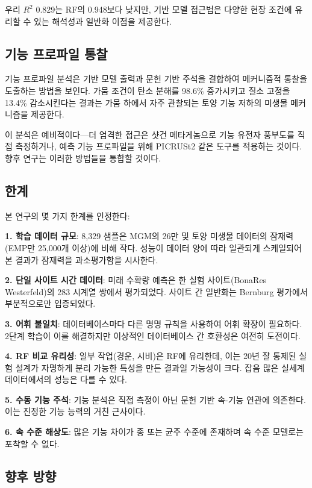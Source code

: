 \documentclass[11pt,a4paper]{article}
\begin{document}
우리 $R^2$ 0.829는 RF의 0.948보다 낮지만, 기반 모델 접근법은 다양한 현장 조건에 유리할 수 있는 해석성과 일반화 이점을 제공한다.

\subsection{기능 프로파일 통찰}

기능 프로파일 분석은 기반 모델 출력과 문헌 기반 주석을 결합하여 메커니즘적 통찰을 도출하는 방법을 보인다. 가뭄 조건이 탄소 분해를 98.6\% 증가시키고 질소 고정을 13.4\% 감소시킨다는 결과는 가뭄 하에서 자주 관찰되는 토양 기능 저하의 미생물 메커니즘을 제공한다.

이 분석은 예비적이다---더 엄격한 접근은 샷건 메타게놈으로 기능 유전자 풍부도를 직접 측정하거나, 예측 기능 프로파일을 위해 PICRUSt2 같은 도구를 적용하는 것이다. 향후 연구는 이러한 방법들을 통합할 것이다.

\subsection{한계}

본 연구의 몇 가지 한계를 인정한다:

\textbf{1. 학습 데이터 규모}: 8,329 샘플은 MGM의 26만 및 토양 미생물 데이터의 잠재력(EMP만 25,000개 이상)에 비해 작다. 성능이 데이터 양에 따라 일관되게 스케일되어 본 결과가 잠재력을 과소평가함을 시사한다.

\textbf{2. 단일 사이트 시간 데이터}: 미래 수확량 예측은 한 실험 사이트(BonaRes Westerfeld)의 283 시계열 쌍에서 평가되었다. 사이트 간 일반화는 Bernburg 평가에서 부분적으로만 입증되었다.

\textbf{3. 어휘 불일치}: 데이터베이스마다 다른 명명 규칙을 사용하여 어휘 확장이 필요하다. 2단계 학습이 이를 해결하지만 이상적인 데이터베이스 간 호환성은 여전히 도전이다.

\textbf{4. RF 비교 유리성}: 일부 작업(경운, 시비)은 RF에 유리한데, 이는 20년 잘 통제된 실험 설계가 자명하게 분리 가능한 특성을 만든 결과일 가능성이 크다. 잡음 많은 실세계 데이터에서의 성능은 다를 수 있다.

\textbf{5. 수동 기능 주석}: 기능 분석은 직접 측정이 아닌 문헌 기반 속-기능 연관에 의존한다. 이는 진정한 기능 능력의 거친 근사이다.

\textbf{6. 속 수준 해상도}: 많은 기능 차이가 종 또는 균주 수준에 존재하며 속 수준 모델로는 포착할 수 없다.

\subsection{향후 방향}
\end{document}
